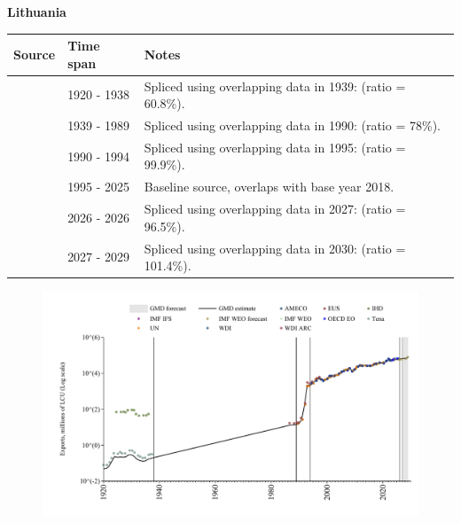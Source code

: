 \documentclass[12pt,a4paper,landscape]{article}
\begin{document}
\begin{adjustbox}{max totalsize={\paperwidth}{\paperheight},center}
\begin{minipage}[t][\textheight][t]{\textwidth}
\vspace*{0.5cm}
{}
\begin{center}
{\Large\bfseries Lithuania}
\end{center}
\vspace{0.5cm}
\begin{table}[H]
\centering
\small
\begin{tabular}{|l|l|l|}
\hline
\textbf{Source} & \textbf{Time span} & \textbf{Notes} \\
\hline
\rowcolor{white}\cite{Tena}& 1920 - 1938 &Spliced using overlapping data in 1939: (ratio = 60.8\%).\\
\rowcolor{lightgray}\cite{WDI_ARC}& 1939 - 1989 &Spliced using overlapping data in 1990: (ratio = 78\%).\\
\rowcolor{white}\cite{AMECO}& 1990 - 1994 &Spliced using overlapping data in 1995: (ratio = 99.9\%).\\
\rowcolor{lightgray}\cite{OECD_EO}& 1995 - 2025 &Baseline source, overlaps with base year 2018.\\
\rowcolor{white}\cite{AMECO}& 2026 - 2026 &Spliced using overlapping data in 2027: (ratio = 96.5\%).\\
\rowcolor{lightgray}\cite{IMF_WEO_forecast}& 2027 - 2029 &Spliced using overlapping data in 2030: (ratio = 101.4\%).\\
\hline
\end{tabular}
\end{table}
\begin{figure}[H]
\centering
\includegraphics[width=\textwidth,height=0.6\textheight,keepaspectratio]{graphs/LTU_exports.pdf}
\end{figure}
\end{minipage}
\end{adjustbox}
\end{document}
